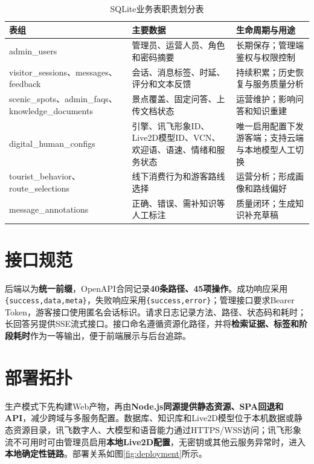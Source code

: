 \begin{table}[H]
  \centering
  \caption{SQLite业务表职责划分表}\label{tab:database}
  \begin{tabularx}{\textwidth}{p{}X p{}}
    \toprule
    表组 & 主要数据 & 生命周期与用途 \\
    \midrule
    admin\_users & 管理员、运营人员、角色和密码摘要 & 长期保存；管理端鉴权与权限控制 \\
    visitor\_sessions、messages、feedback & 会话、消息标签、时延、评分和文本反馈 & 持续积累；历史恢复与服务质量分析 \\
    scenic\_spots、admin\_faqs、knowledge\_documents & 景点覆盖、固定问答、上传文档状态 & 运营维护；影响问答和知识重建 \\
    digital\_human\_configs & 引擎、讯飞形象ID、Live2D模型ID、VCN、欢迎语、语速、情绪和服务状态 & 唯一启用配置下发游客端；支持云端与本地模型人工切换 \\
    tourist\_behavior、route\_selections & 线下消费行为和游客路线选择 & 运营分析；形成画像和路线偏好 \\
    message\_annotations & 正确、错误、需补知识等人工标注 & 质量闭环；生成知识补充草稿 \\
    \bottomrule
  \end{tabularx}
\end{table}

\section{接口规范}

后端以为\textbf{统一前缀}，OpenAPI合同记录\textbf{40条路径、45项操作}。成功响应采用\texttt{\{success,data,meta\}}，失败响应采用\texttt{\{success,error\}}；管理接口要求Bearer Token，游客接口使用匿名会话标识。请求日志记录方法、路径、状态码和耗时；长回答另提供SSE流式接口。接口命名遵循资源化路径，并将\textbf{检索证据、标签和阶段耗时}作为一等输出，便于前端展示与后台追踪。

\newpage
\section{部署拓扑}

生产模式下先构建Web产物，再由\textbf{Node.js同源提供静态资源、SPA回退和API}，减少跨域与多服务配置。数据库、知识库和Live2D模型位于本机数据或静态资源目录，讯飞数字人、大模型和语音能力通过HTTPS/WSS访问；讯飞形象流不可用时可由管理员启用\textbf{本地Live2D配置}，无密钥或其他云服务异常时，进入\textbf{本地确定性链路}。部署关系如图\ref{fig:deployment}所示。

